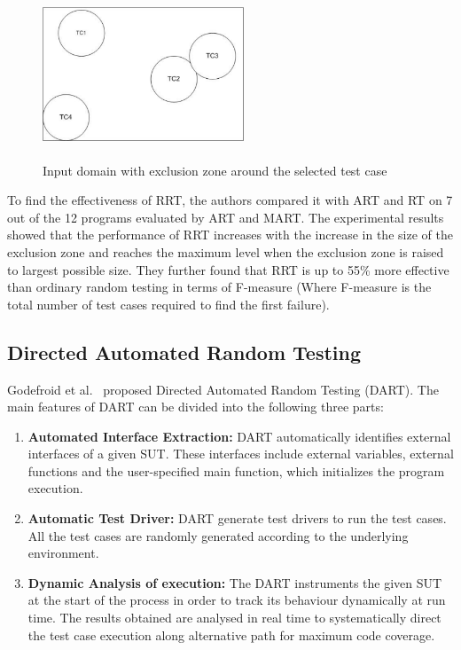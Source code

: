 \begin{figure}[h]
	\centering
	\includegraphics[width= 6cm, height = 5cm]{chapter3/RRT.pdf}
	\caption{Input domain with exclusion zone around the selected test case}
\end{figure}

To find the effectiveness of RRT, the authors compared it with ART and RT on 7 out of the 12 programs evaluated by ART and MART. The experimental results showed that the performance of RRT increases with the increase in the size of the exclusion zone and reaches the maximum level when the exclusion zone is raised to largest possible size. %
They further found that RRT is up to 55\% more effective than ordinary random testing in terms of F-measure (Where F-measure is the total number of test cases required to find the first failure).



\subsection{Directed Automated Random Testing}
Godefroid et al.~\cite{Godefroid2005} proposed Directed Automated Random Testing (DART). %
The main features of DART can be divided into the following three parts:
\begin{enumerate}
\item {\bf Automated Interface Extraction:} DART automatically identifies external interfaces of a given SUT. These interfaces include external variables, external functions and the user-specified main function, which initializes the program execution.
\item {\bf Automatic Test Driver:} DART generate test drivers to run the test cases. All the test cases are randomly generated according to the underlying environment.
\item {\bf Dynamic Analysis of execution:} The DART instruments the given SUT at the start of the process in order to track its behaviour dynamically at run time. The results obtained are analysed in real time to systematically direct the test case execution along alternative path for maximum code coverage.
\end{enumerate}

